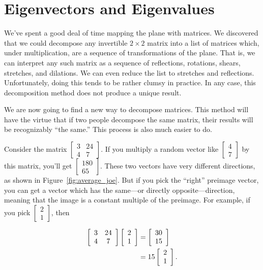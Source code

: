 \documentclass[../gatm.tex]{subfiles}
\begin{document}
\section{Eigenvectors and Eigenvalues}
\setcounter{problem_i}{0}

We've spent a good deal of time mapping the plane with matrices. We discovered that we could decompose any invertible $2\times 2$ matrix into a list of matrices which, under multiplication, are a sequence of transformations of the plane. That is, we can interpret any such matrix as a sequence of reflections, rotations, shears, stretches, and dilations. We can even reduce the list to stretches and reflections. Unfortunately, doing this tends to be rather clumsy in practice. In any case, this decomposition method does not produce a unique result.

We are now going to find a new way to decompose matrices. This method will have the virtue that if two people decompose the same matrix, their results will be recognizably ``the same.'' This process is also much easier to do.

Consider the matrix $\left[\begin{smallmatrix}3 & 24 \\ 4 & 7\end{smallmatrix}\right]$. If you multiply a random vector like $\left[\begin{smallmatrix}4 \\ 7\end{smallmatrix}\right]$ by this matrix, you'll get $\left[\begin{smallmatrix}180 \\ 65\end{smallmatrix}\right]$. These two vectors have very different directions, as shown in Figure~\ref{fig:average_joe}. But if you pick the ``right'' preimage vector, you can get a vector which has the same---or directly opposite---direction, meaning that the image is a constant multiple of the preimage. For example, if you pick $\left[\begin{smallmatrix}2 \\ 1 \end{smallmatrix}\right]$, then

\begin{align*}
\left[\begin{array}{cc} 3 & 24 \\ 4 & 7 \end{array}\right]\left[\begin{array}{c} 2 \\ 1 \end{array}\right]&=\left[\begin{array}{c} 30 \\ 15 \end{array}\right] \\
&= 15\left[\begin{array}{c} 2 \\ 1 \end{array}\right].
\end{align*}
\end{document}
